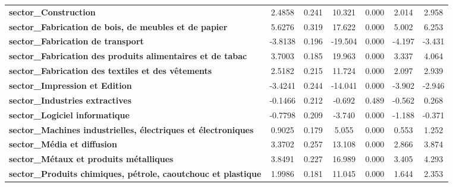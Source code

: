 \begin{center}
\begin{tabular}{lcccccc}
\textbf{sector\_Construction}                                         &       2.4858  &        0.241     &    10.321  &         0.000        &        2.014    &        2.958     \\
\textbf{sector\_Fabrication de bois, de meubles et de papier}         &       5.6276  &        0.319     &    17.622  &         0.000        &        5.002    &        6.253     \\
\textbf{sector\_Fabrication de transport}                             &      -3.8138  &        0.196     &   -19.504  &         0.000        &       -4.197    &       -3.431     \\
\textbf{sector\_Fabrication des produits alimentaires et de tabac}    &       3.7003  &        0.185     &    19.963  &         0.000        &        3.337    &        4.064     \\
\textbf{sector\_Fabrication des textiles et des vêtements}            &       2.5182  &        0.215     &    11.724  &         0.000        &        2.097    &        2.939     \\
\textbf{sector\_Impression et Edition}                                &      -3.4241  &        0.244     &   -14.041  &         0.000        &       -3.902    &       -2.946     \\
\textbf{sector\_Industries extractives}                               &      -0.1466  &        0.212     &    -0.692  &         0.489        &       -0.562    &        0.268     \\
\textbf{sector\_Logiciel informatique}                                &      -0.7798  &        0.209     &    -3.740  &         0.000        &       -1.188    &       -0.371     \\
\textbf{sector\_Machines industrielles, électriques et électroniques} &       0.9025  &        0.179     &     5.055  &         0.000        &        0.553    &        1.252     \\
\textbf{sector\_Média et diffusion}                                   &       3.3702  &        0.257     &    13.108  &         0.000        &        2.866    &        3.874     \\
\textbf{sector\_Métaux et produits métalliques}                       &       3.8491  &        0.227     &    16.989  &         0.000        &        3.405    &        4.293     \\
\textbf{sector\_Produits chimiques, pétrole, caoutchouc et plastique} &       1.9986  &        0.181     &    11.045  &         0.000        &        1.644    &        2.353     \\

\end{tabular}
\end{center}
